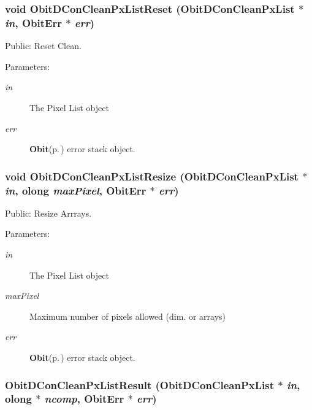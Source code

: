 \subsubsection{\setlength{\rightskip}{0pt plus 5cm}void Obit\-DCon\-Clean\-Px\-List\-Reset ({\bf Obit\-DCon\-Clean\-Px\-List} $\ast$ {\em in}, {\bf Obit\-Err} $\ast$ {\em err})}\label{ObitDConCleanPxList_8h_a18}


Public: Reset Clean. 

\begin{Desc}
\item[Parameters:]
\begin{description}
\item[{\em in}]The Pixel List object \item[{\em err}]{\bf Obit}{\rm (p.\,\pageref{structObit})} error stack object. \end{description}
\end{Desc}
\subsubsection{\setlength{\rightskip}{0pt plus 5cm}void Obit\-DCon\-Clean\-Px\-List\-Resize ({\bf Obit\-DCon\-Clean\-Px\-List} $\ast$ {\em in}, {\bf olong} {\em max\-Pixel}, {\bf Obit\-Err} $\ast$ {\em err})}\label{ObitDConCleanPxList_8h_a19}


Public: Resize Arrrays. 

\begin{Desc}
\item[Parameters:]
\begin{description}
\item[{\em in}]The Pixel List object \item[{\em max\-Pixel}]Maximum number of pixels allowed (dim. or arrays) \item[{\em err}]{\bf Obit}{\rm (p.\,\pageref{structObit})} error stack object. \end{description}
\end{Desc}
\subsubsection{ Obit\-DCon\-Clean\-Px\-List\-Result ({\bf Obit\-DCon\-Clean\-Px\-List} $\ast$ {\em in}, {\bf olong} $\ast$ {\em ncomp}, {\bf Obit\-Err} $\ast$ {\em err})}\label{ObitDConCleanPxList_8h_a23}


